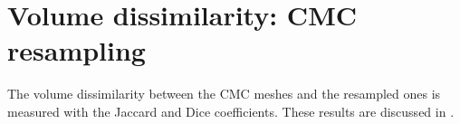 \section{Volume dissimilarity: CMC resampling}
\label{appendix:volume_CMC_resampling}

The volume dissimilarity between the CMC meshes \mo* and the resampled ones \md* is measured with the Jaccard and Dice coefficients. These results are discussed in . 



